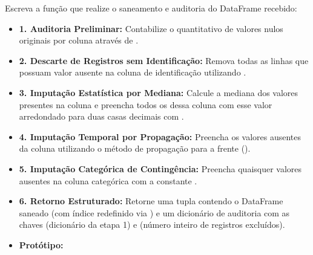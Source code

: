 \begin{enumerate}[label=\textbf{Q\arabic*.}]
Escreva a função  que realize o saneamento e auditoria do DataFrame recebido:
\begin{itemize}[leftmargin=*]
    \item \textbf{1. Auditoria Preliminar:}\newline
    Contabilize o quantitativo de valores nulos originais por coluna através de .
    \item \textbf{2. Descarte de Registros sem Identificação:}\newline
    Remova todas as linhas que possuam valor ausente na coluna de identificação  utilizando .
    \item \textbf{3. Imputação Estatística por Mediana:}\newline
    Calcule a mediana dos valores presentes na coluna  e preencha todos os  dessa coluna com esse valor arredondado para duas casas decimais com .
    \item \textbf{4. Imputação Temporal por Propagação:}\newline
    Preencha os valores ausentes da coluna  utilizando o método de propagação para a frente ().
    \item \textbf{5. Imputação Categórica de Contingência:}\newline
    Preencha quaisquer valores ausentes na coluna categórica  com a constante .
    \item \textbf{6. Retorno Estruturado:}\newline
    Retorne uma tupla contendo o DataFrame saneado (com índice redefinido via ) e um dicionário de auditoria com as chaves  (dicionário da etapa 1) e  (número inteiro de registros excluídos).
\end{itemize}

\begin{itemize}[leftmargin=*]
    \item \textbf{Protótipo:}\newline
    \\\\\\\\
\end{itemize}


\end{enumerate}
